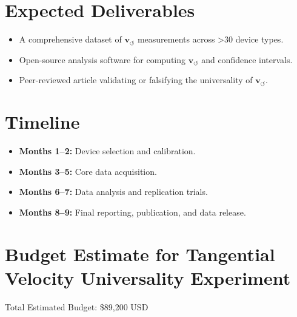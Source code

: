 \documentclass[11pt]{article}
\begin{document}
        \section*{Expected Deliverables}
        \begin{itemize}
            \item A comprehensive dataset of \( \mathbf{v}_{\scriptscriptstyle\boldsymbol{\circlearrowleft}} \) measurements across >30 device types.
            \item Open-source analysis software for computing \( \mathbf{v}_{\scriptscriptstyle\boldsymbol{\circlearrowleft}} \) and confidence intervals.
            \item Peer-reviewed article validating or falsifying the universality of \( \mathbf{v}_{\scriptscriptstyle\boldsymbol{\circlearrowleft}} \).
        \end{itemize}

        \section*{Timeline}
        \begin{itemize}
            \item \textbf{Months 1–2:} Device selection and calibration.
            \item \textbf{Months 3–5:} Core data acquisition.
            \item \textbf{Months 6–7:} Data analysis and replication trials.
            \item \textbf{Months 8–9:} Final reporting, publication, and data release.
        \end{itemize}

\section*{Budget Estimate for Tangential Velocity Universality Experiment}

Total Estimated Budget: \$89,200 USD
\end{document}
